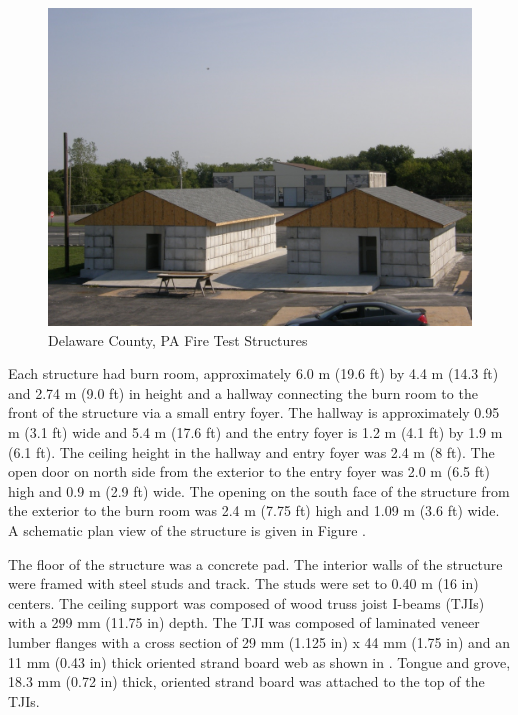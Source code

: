 \documentclass[12pt,oneside]{book}
\begin{document}
\begin{figure}[!ht]
	\includegraphics[width=6in]{../Figures/Pictures/DelCo_Structures}
	\caption{Delaware County, PA Fire Test Structures}
	\label{fig:Delaware_County,_PA_Fire_Test_Structures}
\end{figure}

Each structure had burn room, approximately 6.0 m (19.6 ft) by 4.4 m (14.3 ft) and 2.74 m (9.0 ft) in height and a hallway connecting the burn room to the front of the structure via a small entry foyer.  The hallway is approximately 0.95 m (3.1 ft) wide and 5.4 m (17.6 ft) and the entry foyer is 1.2 m (4.1 ft) by 1.9 m (6.1 ft).  The ceiling height in the hallway and entry foyer was 2.4 m (8 ft).  The open door on north side from the exterior to the entry foyer was 2.0 m (6.5 ft) high and 0.9 m (2.9 ft) wide.  The opening on the south face of the structure from the exterior to the burn room was 2.4 m (7.75 ft) high and 1.09 m (3.6 ft) wide.   A schematic plan view of the structure is given in Figure     .    

The floor of the structure was a concrete pad.  The interior walls of the structure were framed with steel studs and track.  The studs were set to 0.40 m (16 in) centers.  The ceiling support was composed of wood truss joist I-beams (TJIs) with a 299 mm (11.75 in) depth.  The TJI was composed of laminated veneer lumber flanges with a cross section of 29 mm (1.125 in) x 44 mm (1.75 in) and an 11 mm (0.43 in) thick oriented strand board web as shown in .  Tongue and grove, 18.3 mm (0.72 in) thick, oriented strand board was attached to the top of the TJIs.     
\end{document}
